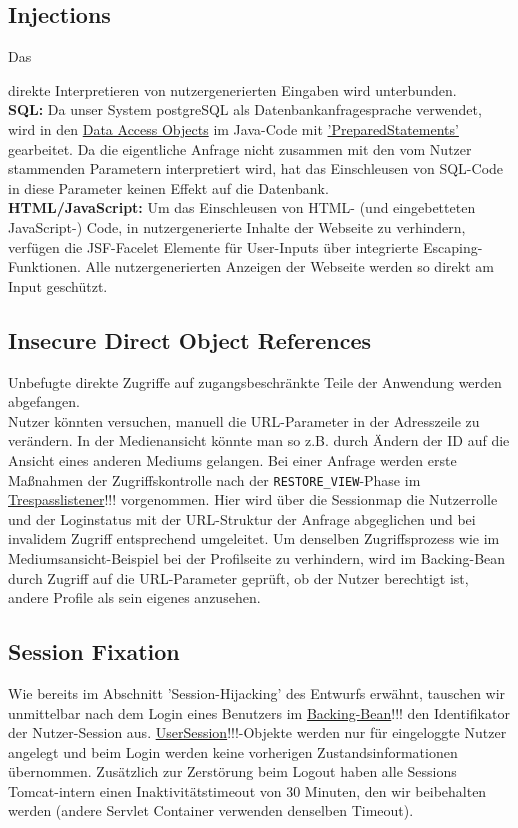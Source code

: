 \documentclass{article}
\begin{document}
\subsection{Injections}
\hypertarget{Injections}{Das} direkte Interpretieren von nutzergenerierten Eingaben wird unterbunden.\\
\textbf{SQL:} Da unser System postgreSQL als Datenbankanfragesprache verwendet, wird in den \hyperlink{DAOs}{Data Access Objects} im Java-Code mit \hyperlink{https://docs.oracle.com/javase/7/docs/api/java/sql/PreparedStatement.html}{'PreparedStatements'} gearbeitet. Da die eigentliche Anfrage nicht zusammen mit den vom Nutzer stammenden Parametern interpretiert wird, hat das Einschleusen von SQL-Code in diese Parameter keinen Effekt auf die Datenbank.\\
\textbf{HTML/JavaScript:} \hypertarget{XSS}{Um} das Einschleusen von HTML- (und eingebetteten JavaScript-) Code, in nutzergenerierte Inhalte der Webseite zu verhindern, verfügen die JSF-Facelet Elemente für User-Inputs über integrierte Escaping-Funktionen. Alle nutzergenerierten Anzeigen der Webseite werden so direkt am Input geschützt.
\subsection{Insecure Direct Object References}
Unbefugte direkte Zugriffe auf zugangsbeschränkte Teile der Anwendung werden abgefangen.\\ 
Nutzer könnten versuchen, manuell die URL-Parameter in der Adresszeile zu verändern. In der Medienansicht könnte man so z.B. durch Ändern der ID auf die Ansicht eines anderen Mediums gelangen. Bei einer Anfrage werden erste Maßnahmen der Zugriffskontrolle nach der \texttt{RESTORE\_VIEW}-Phase im \hyperlink{PhaseListener}{Trespasslistener}!!! vorgenommen. Hier wird über die Sessionmap die Nutzerrolle und der Loginstatus mit der URL-Struktur der Anfrage abgeglichen und bei invalidem Zugriff entsprechend umgeleitet. Um denselben Zugriffsprozess wie im Mediumsansicht-Beispiel bei der Profilseite zu verhindern, wird im Backing-Bean durch Zugriff auf die URL-Parameter geprüft, ob der Nutzer berechtigt ist, andere Profile als sein eigenes anzusehen. 
\subsection{Session Fixation}
Wie bereits im Abschnitt 'Session-Hijacking' des Entwurfs erwähnt, tauschen wir unmittelbar nach dem Login eines Benutzers im \hyperlink{Login}{Backing-Bean}!!! den Identifikator der Nutzer-Session aus. \hyperlink{Session}{UserSession}!!!-Objekte werden nur für eingeloggte Nutzer angelegt und beim Login werden keine vorherigen Zustandsinformationen übernommen.  Zusätzlich zur Zerstörung beim Logout haben alle Sessions Tomcat-intern einen Inaktivitätstimeout von 30 Minuten, den wir beibehalten werden (andere Servlet Container verwenden denselben Timeout).
\end{document}
